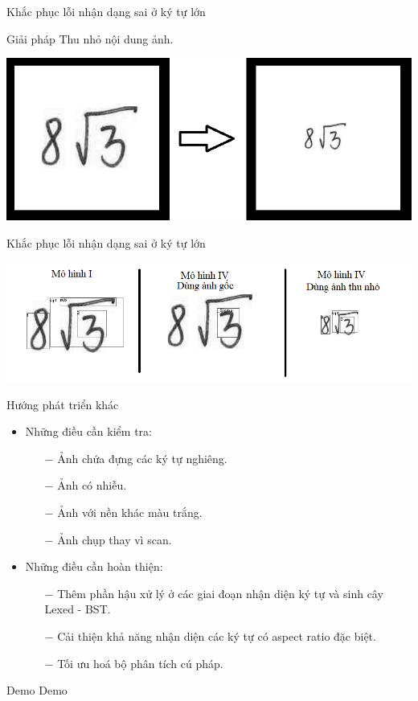 \documentclass{beamer}
\begin{document}
	\begin{frame}{Khắc phục lỗi nhận dạng sai ở ký tự lớn}
		\begin{block}{Giải pháp}
			Thu nhỏ nội dung ảnh.
		\end{block}
		\begin{center}
			\centering
			\includegraphics[width=0.775\linewidth]{ensmall.png}
			\vspace{0.5cm}
		\end{center}
	\end{frame}
	
	\begin{frame}{Khắc phục lỗi nhận dạng sai ở ký tự lớn}
		\begin{center}
			\centering
			\includegraphics[width=0.875\linewidth]{compare_future.png}
			\vspace{0.5cm}
		\end{center}
	\end{frame}
	
	\begin{frame}{Hướng phát triển khác}
		\begin{itemize}
			\item Những điều cần kiểm tra:
			\begin{itemize}
				\item [$-$]Ảnh chứa đựng các ký tự nghiêng.
				\item [$-$]Ảnh có nhiễu.
				\item [$-$]Ảnh với nền khác màu trắng.
				\item [$-$]Ảnh chụp thay vì scan.
			\end{itemize}
			\item Những điều cần hoàn thiện:
			\begin{itemize}
				\item [$-$]Thêm phần hậu xử lý ở các giai đoạn nhận diện ký tự và sinh cây Lexed - BST.
				\item [$-$]Cải thiện khả năng nhận diện các ký tự có aspect ratio đặc biệt.
				\item [$-$]Tối ưu hoá bộ phân tích cú pháp. 
			\end{itemize}
		\end{itemize}
	\end{frame}
	\begin{frame}{Demo}
	\huge{Demo}
	\end{frame}
\end{document}
